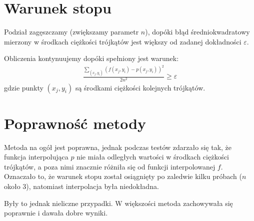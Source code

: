 \documentclass[12pt]{article}
\begin{document}
	\section{Warunek stopu}
	Podział zagęszczamy (zwiększamy parametr $n$), dopóki błąd średniokwadratowy mierzony w środkach ciężkości trójkątów jest większy od zadanej dokładności $\varepsilon$.
	
	Obliczenia kontynuujemy dopóki spełniony jest warunek:
	\begin{align*}
		\frac{\sum_{(x_j, y_i)} (f(x_j, y_i) - p(x_j, y_i))^2}{2n^2} \geq \varepsilon
	\end{align*}
	gdzie punkty $(x_j, y_i)$ są środkami ciężkości kolejnych trójkątów.
	
	\section{Poprawność metody}
	Metoda na ogół jest poprawna, jednak podczas testów zdarzało się tak, że funkcja interpolująca $p$ nie miała odległych wartości w środkach ciężkości trójkątów, a poza nimi znacznie różniła się od funkcji interpolowanej $f$. Oznaczało to, że warunek stopu został osiągnięty po zaledwie kilku próbach ($n$ około 3), natomiast interpolacja była niedokładna.
	
	Były to jednak nieliczne przypadki. W większości metoda zachowywała się poprawnie i dawała dobre wyniki.
	
\end{document}

